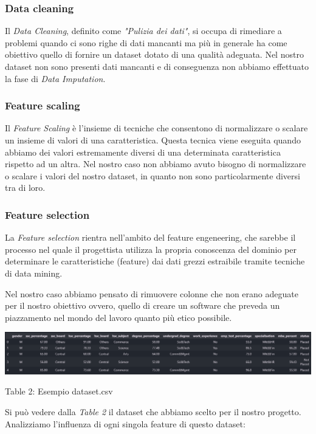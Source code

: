 \documentclass[12pt]{article}
\begin{document}
\subsubsection{Data cleaning}
Il \textit{Data Cleaning}, definito come \textit{"Pulizia dei dati"}, si occupa di rimediare a problemi quando ci sono righe
di dati mancanti ma più in generale ha come obiettivo quello di fornire un dataset dotato di una qualità adeguata.
Nel nostro dataset non sono presenti dati mancanti e di conseguenza non abbiamo effettuato la fase di \textit{Data Imputation}.

\subsubsection{Feature scaling}
Il \textit{Feature Scaling} è l'insieme di tecniche che consentono di normalizzare o scalare un insieme di valori di una caratteristica.
Questa tecnica viene eseguita quando abbiamo dei valori estremamente diversi di una determinata caratteristica rispetto ad un altra.
Nel nostro caso non abbiamo avuto bisogno di normalizzare o scalare i valori del nostro dataset, in quanto non sono particolarmente diversi tra di loro.


\subsubsection{Feature selection}
La \textit{Feature selection} rientra nell'ambito del feature engeneering, che sarebbe il processo nel quale il progettista
utilizza la propria conoscenza del dominio per determinare le caratteristiche (feature) dai dati grezzi estraibile tramite tecniche
di data mining.

Nel nostro caso abbiamo pensato di rimuovere colonne che non erano adeguate per il nostro obiettivo ovvero, quello di creare
un software che preveda un piazzamento nel mondo del lavoro quanto più etico possibile.

\begin{center}
    \includegraphics[scale=0.46]{csvimage.png}

    Table 2: Esempio dataset.csv
\end{center}

Si può vedere dalla \textit{Table 2} il dataset che abbiamo scelto per il nostro progetto.
Analizziamo l'influenza di ogni singola feature di questo dataset:
\end{document}
